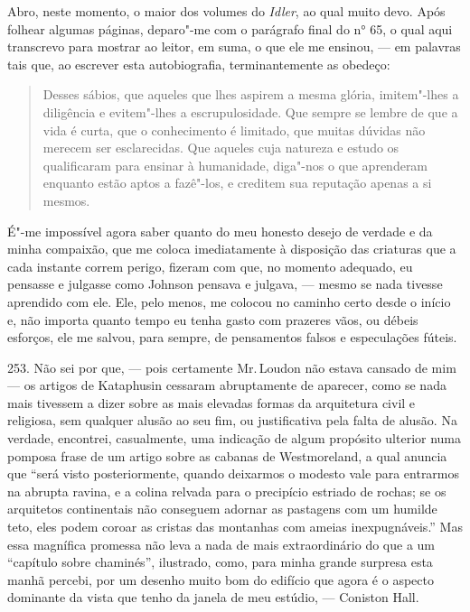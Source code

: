 Abro, neste momento, o maior dos volumes do \emph{Idler}, ao qual muito
devo. Após folhear algumas páginas, deparo"-me com o parágrafo final do
n° 65, o qual aqui transcrevo para mostrar ao leitor, em suma, o que ele
me ensinou, --- em palavras tais que, ao escrever esta autobiografia,
terminantemente as obedeço: %

\begin{quote}
Desses sábios, que aqueles que lhes aspirem a mesma glória,
imitem"-lhes a diligência e evitem"-lhes a escrupulosidade. Que sempre se
lembre de que a vida é curta, que o conhecimento é limitado, que muitas
dúvidas não merecem ser esclarecidas. Que aqueles cuja natureza e estudo
os qualificaram para ensinar à humanidade, diga"-nos o que aprenderam
enquanto estão aptos a fazê"-los, e creditem sua reputação apenas a si
mesmos.
\end{quote}

É"-me impossível agora saber quanto do meu honesto desejo de verdade e da
minha compaixão, que me coloca imediatamente à disposição das criaturas
que a cada instante correm perigo, fizeram com que, no momento adequado,
eu pensasse e julgasse como Johnson pensava e julgava, --- mesmo se nada
tivesse aprendido com ele. Ele, pelo menos, me colocou no caminho certo
desde o início e, não importa quanto tempo eu tenha gasto com prazeres
vãos, ou débeis esforços, ele me salvou, para sempre, de pensamentos
falsos e especulações fúteis.

253. Não sei por que, --- pois certamente Mr.\,Loudon não estava cansado de
mim --- os artigos de Kataphusin cessaram abruptamente de aparecer, como
se nada mais tivessem a dizer sobre as mais elevadas formas da
arquitetura civil e religiosa, sem qualquer alusão ao seu fim, ou
justificativa pela falta de alusão. Na verdade, encontrei, casualmente,
uma indicação de algum propósito ulterior numa pomposa frase de um
artigo sobre as cabanas de Westmoreland, a qual anuncia que ``será visto
posteriormente, quando deixarmos o modesto vale para entrarmos na
abrupta ravina, e a colina relvada para o precipício estriado de rochas;
se os arquitetos continentais não conseguem adornar as pastagens com um
humilde teto, eles podem coroar as cristas das montanhas com ameias
inexpugnáveis.'' Mas essa magnífica promessa não leva a nada de mais
extraordinário do que a um ``capítulo sobre chaminés'', ilustrado, como,
para minha grande surpresa esta manhã percebi, por um desenho muito bom
do edifício que agora é o aspecto dominante da vista que tenho da janela
de meu estúdio, --- Coniston Hall.

